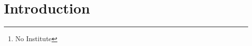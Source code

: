 \documentclass[runningheads,a4paper]{llncs}
\newcommand{\keywords}[1]{\par\addvspace\baselineskip
\noindent\keywordname\enspace\ignorespaces#1}
\begin{document}
\mainmatter  %

\title{}

\titlerunning{}

%
%

\author{A. N. Onymous%
\thanks{No Institute}}



%
%

\maketitle

%
%
\begin{abstract}

\end{abstract}

%
%
\section{Introduction}
\label{sec:intro}




\end{document}
